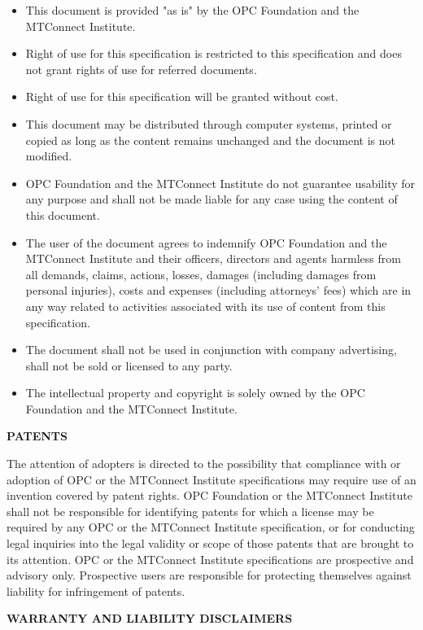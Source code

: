 \documentclass{mtconnect}	%
\begin{document}
\begin{itemize}
    \item This document is provided "as is" by the OPC Foundation and the MTConnect Institute.
    \item Right of use for this specification is restricted to this specification and does not grant rights of use for referred documents.
    \item Right of use for this specification will be granted without cost.
    \item This document may be distributed through computer systems, printed or copied as long as the content remains unchanged and the document is not modified.
    \item OPC Foundation and the MTConnect Institute do not guarantee usability for any purpose and shall not be made liable for any case using the content of this document.
    \item The user of the document agrees to indemnify OPC Foundation and the MTConnect Institute and their officers, directors and agents harmless from all demands, claims, actions, losses, damages (including damages from personal injuries), costs and expenses (including attorneys' fees) which are in any way related to activities associated with its use of content from this specification.
    \item The document shall not be used in conjunction with company advertising, shall not be sold or licensed to any party.
    
    \item The intellectual property and copyright is solely owned by the OPC Foundation and the MTConnect Institute.
\end{itemize}

\textbf{PATENTS} 

The attention of adopters is directed to the possibility that compliance with or adoption of OPC or the MTConnect Institute specifications may require use of an invention covered by patent rights. OPC Foundation or the MTConnect Institute shall not be responsible for identifying patents for which a license may be required by any OPC or the MTConnect Institute specification, or for conducting legal inquiries into the legal validity or scope of those patents that are brought to its attention. OPC or the MTConnect Institute specifications are prospective and advisory only. Prospective users are responsible for protecting themselves against liability for infringement of patents.

\textbf{WARRANTY AND LIABILITY DISCLAIMERS}
\end{document}
